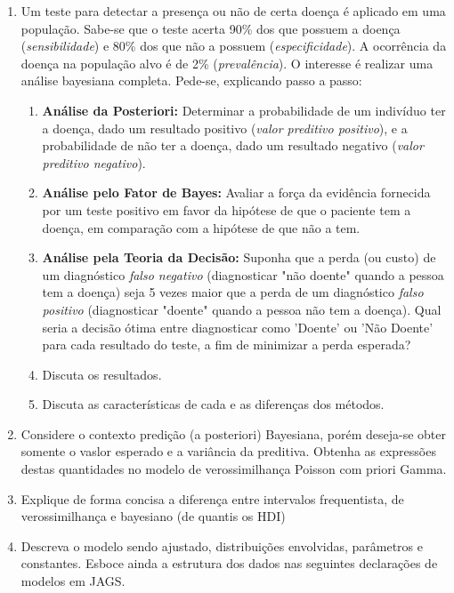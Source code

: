 \documentclass[11pt,a4]{article}\usepackage[]{graphicx}\usepackage[]{xcolor}
\begin{document}
\begin{enumerate}
\item  Um teste para detectar a presença ou não de certa doença é aplicado em uma população. Sabe-se que o teste acerta 90\% dos que possuem a doença ({\it sensibilidade}) e 80\% dos que não a possuem ({\it especificidade}). A ocorrência da doença na população alvo é de 2\% ({\it prevalência}).
O interesse é realizar uma análise bayesiana completa. Pede-se, explicando passo a passo:
\begin{enumerate}
\item {\bf Análise da Posteriori:} Determinar a probabilidade de um indivíduo ter a doença, dado um resultado positivo ({\it valor preditivo positivo}), e a probabilidade de não ter a doença, dado um resultado negativo ({\it valor preditivo negativo}).
\item {\bf Análise pelo Fator de Bayes:} Avaliar a força da evidência fornecida por um teste positivo em favor da hipótese de que o paciente tem a doença, em comparação com a hipótese de que não a tem.
\item {\bf Análise pela Teoria da Decisão:} Suponha que a perda (ou custo) de um diagnóstico {\it falso negativo} (diagnosticar "não doente" quando a pessoa tem a doença) seja 5 vezes maior que a perda de um diagnóstico {\it falso positivo} (diagnosticar "doente" quando a pessoa não tem a doença). Qual seria a decisão ótima entre diagnosticar como 'Doente' ou 'Não Doente' para cada resultado do teste, a fim de minimizar a perda esperada?
\item Discuta os resultados.
\item Discuta as características de cada e as diferenças dos métodos.
\end{enumerate}

\item Considere o contexto predição (a posteriori) Bayesiana, porém deseja-se obter somente o vaslor esperado e a variância da preditiva. Obtenha as expressões destas quantidades no modelo
  de verossimilhança Poisson com priori Gamma.

\item Explique de forma concisa a diferença entre intervalos frequentista, de verossimilhança e
  bayesiano (de quantis os HDI)


\item Descreva o modelo sendo ajustado, distribuições envolvidas, parâmetros e constantes.
  Esboce ainda a estrutura dos dados nas seguintes declarações de modelos em JAGS.

\begin{enumerate}


\end{enumerate}
\end{enumerate}
\end{document}
